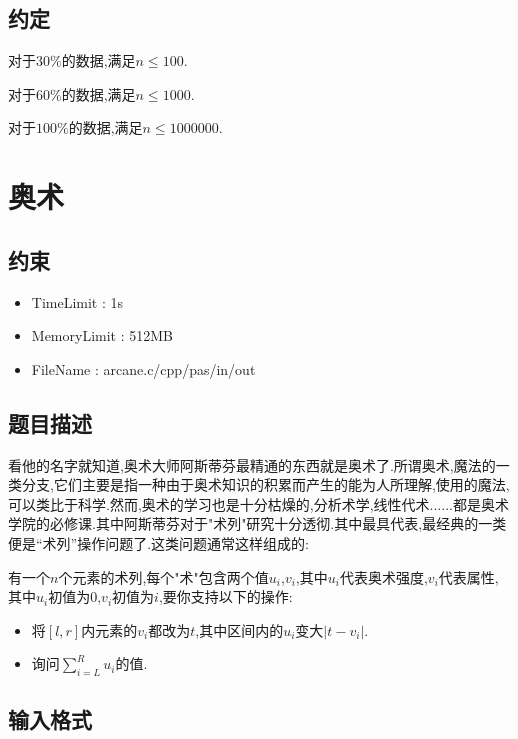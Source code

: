 \documentclass[]{article}
\begin{document}
\subsection{约定}

对于$30\%$的数据,满足$n \le 100$.

对于$60\%$的数据,满足$n \le 1000$.

对于$100\%$的数据,满足$n \le 1000000$.

\newpage

\section{奥术}

\subsection{约束}

\begin{itemize}
  
\item TimeLimit : 1s

\item MemoryLimit : 512MB

\item FileName : arcane.c/cpp/pas/in/out
  
\end{itemize}

\subsection{题目描述}

看他的名字就知道,奥术大师阿斯蒂芬最精通的东西就是奥术了.所谓奥术,魔法的一类分支,它们主要是指一种由于奥术知识的积累而产生的能为人所理解,使用的魔法,可以类比于科学.然而,奥术的学习也是十分枯燥的,分析术学,线性代术......都是奥术学院的必修课.其中阿斯蒂芬对于"术列"研究十分透彻.其中最具代表,最经典的一类便是“术列”操作问题了.这类问题通常这样组成的:

有一个$n$个元素的术列,每个"术"包含两个值$u_i$,$v_i$,其中$u_i$代表奥术强度,$v_i$代表属性,其中$u_i$初值为$0$,$v_i$初值为$i$,要你支持以下的操作:

\begin{itemize}
\item 将$[l,r]$内元素的$v_i$都改为$t$,其中区间内的$u_i$变大$|t-v_i|$.
\item 询问$\sum_{i=L}^{R}u_{i}$的值.
\end{itemize}

\subsection{输入格式}
\end{document}
